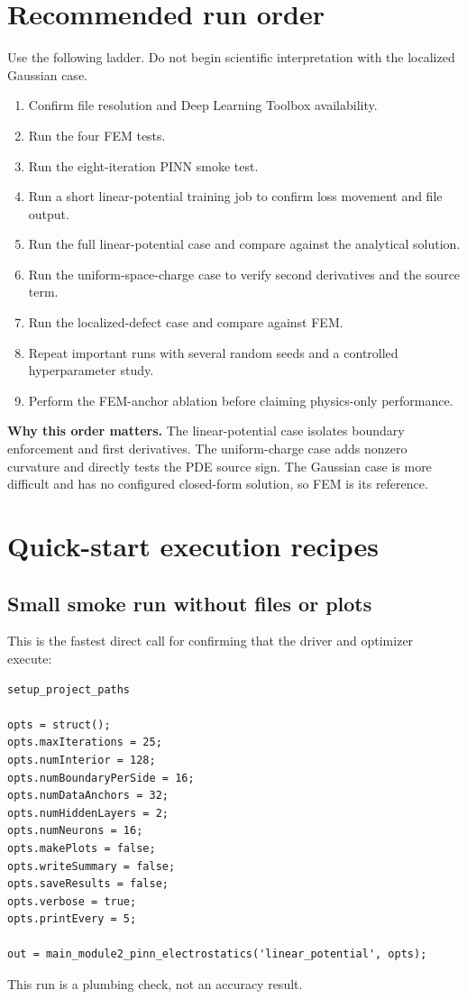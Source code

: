 \documentclass[11pt]{article}
\begin{document}
\section{Recommended run order}

Use the following ladder. Do not begin scientific interpretation with the localized Gaussian case.

\begin{enumerate}[leftmargin=*]
  \item Confirm file resolution and Deep Learning Toolbox availability.
  \item Run the four FEM tests.
  \item Run the eight-iteration PINN smoke test.
  \item Run a short linear-potential training job to confirm loss movement and file output.
  \item Run the full linear-potential case and compare against the analytical solution.
  \item Run the uniform-space-charge case to verify second derivatives and the source term.
  \item Run the localized-defect case and compare against FEM.
  \item Repeat important runs with several random seeds and a controlled hyperparameter study.
  \item Perform the FEM-anchor ablation before claiming physics-only performance.
\end{enumerate}

\begin{physicsbox}
\textbf{Why this order matters.} The linear-potential case isolates boundary enforcement and first derivatives. The uniform-charge case adds nonzero curvature and directly tests the PDE source sign. The Gaussian case is more difficult and has no configured closed-form solution, so FEM is its reference.
\end{physicsbox}

\section{Quick-start execution recipes}

\subsection{Small smoke run without files or plots}

This is the fastest direct call for confirming that the driver and optimizer execute:
\begin{lstlisting}[style=projectmatlab]
setup_project_paths

opts = struct();
opts.maxIterations = 25;
opts.numInterior = 128;
opts.numBoundaryPerSide = 16;
opts.numDataAnchors = 32;
opts.numHiddenLayers = 2;
opts.numNeurons = 16;
opts.makePlots = false;
opts.writeSummary = false;
opts.saveResults = false;
opts.verbose = true;
opts.printEvery = 5;

out = main_module2_pinn_electrostatics('linear_potential', opts);
\end{lstlisting}
This run is a plumbing check, not an accuracy result.
\end{document}
